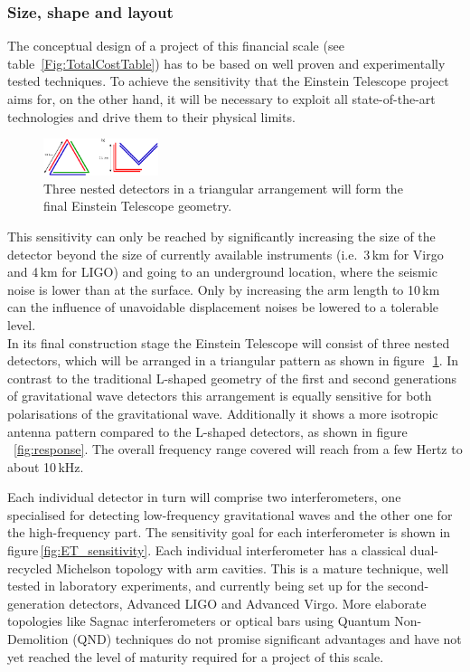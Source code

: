 \subsubsection{Size, shape and layout}
The conceptual design of a project of this financial scale (see 
table~\ref{Fig:TotalCostTable}) has to be based on well proven and 
experimentally tested techniques. To achieve the sensitivity that the Einstein 
Telescope project aims for, on the other hand, it will be necessary to exploit all 
state-of-the-art technologies and drive them to their physical limits.
\begin{figure}
	\centering
		\includegraphics[width=0.3\textwidth]{Sec_Introduction/NestedDetectors.pdf}
	\caption{Three nested detectors in a triangular arrangement will 
	form the final Einstein Telescope geometry.}
	\label{fig:NestedDetectors}
\end{figure}
This sensitivity can only be reached by significantly increasing the size of the 
detector beyond the size of currently available instruments (i.e.\ 3\,km for Virgo 
and 4\,km for LIGO) and going to an underground location, where the seismic 
noise is lower than at the surface. Only by increasing the arm length to 10\,km 
can the influence of unavoidable displacement noises be lowered to a tolerable 
level.\\
In its final construction stage the Einstein Telescope will consist of three nested
detectors, which will be arranged in a triangular pattern as shown in 
figure\,~\ref{fig:NestedDetectors}. 
In contrast to the traditional L-shaped geometry of the first and second generations 
of gravitational wave detectors this arrangement is equally sensitive for both 
polarisations of the gravitational wave. Additionally it shows a more isotropic 
antenna pattern compared to the L-shaped detectors, as shown in 
figure\,~\ref{fig:response}. The overall frequency range covered will reach from 
a few Hertz to about 10\,kHz.

Each individual detector in turn will comprise two interferometers, one 
specialised for detecting low-frequency gravitational waves and the other one 
for the high-frequency part. The sensitivity goal for each interferometer is shown 
in figure\,\ref{fig:ET_sensitivity}. %
Each individual interferometer has a classical dual-recycled Michelson topology 
with arm cavities. This is a mature technique, well tested in laboratory 
experiments, and currently being set up for the second-generation detectors, 
Advanced LIGO and Advanced Virgo. More elaborate topologies like Sagnac 
interferometers or optical bars using Quantum Non-Demolition (QND) techniques 
do not promise significant advantages and have not yet reached the level of 
maturity required for a project of this scale.\\

